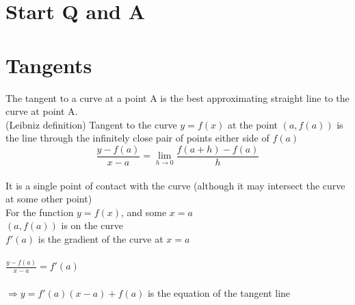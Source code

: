 \documentclass[10pt]{article}
\newcommand{\x}{0}
\begin{document}
\section{Start Q and A}
\section{Tangents}
The tangent to a curve at a point A is the best approximating straight line to the curve at point A.\\

(Leibniz definition) Tangent to the curve $y=f(x)$ at the point $(a,f(a))$ is the line through the infinitely close pair of points either side of $f(a)$\\

$$\frac{y-f(a)}{x-a} =\lim\limits_{h\to 0}\frac{f(a+h)-f(a)}{h}$$\\


It is a single point of contact with the curve (although it may intersect the curve at some other point)\\


For the function $y=f(x)$, and some $x=a$\\
$(a,f(a))$ is on the curve \\
$f'(a)$ is the gradient of the curve at $x=a$\\\\
$\displaystyle \frac{y-f(a)}{x-a}=f'(a)$\\\\
$\Rightarrow y= f'(a)(x-a) + f(a)$ is the equation of the tangent line\vspace{2cm}
\end{document}
